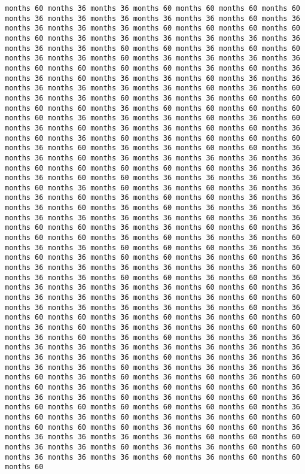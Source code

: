 \documentclass[11pt]{article}
\begin{document}
\begin{Verbatim}[commandchars=\\\{\}, frame=single, framerule=2mm, rulecolor=\color{outerrorbackground}]
months 60 months 36 months 36 months 60 months 60 months 60 months 60 months 36 months 36 months 36 months 36 months 36 months 60 months 36 months 36 months 36 months 36 months 60 months 60 months 60 months 60 months 60 months 36 months 36 months 36 months 36 months 36 months 36 months 36 months 36 months 60 months 60 months 36 months 60 months 60 months 36 months 36 months 60 months 36 months 36 months 36 months 36 months 60 months 60 months 60 months 60 months 36 months 60 months 36 months 36 months 60 months 36 months 36 months 60 months 36 months 36 months 36 months 36 months 36 months 36 months 60 months 36 months 60 months 36 months 36 months 60 months 36 months 36 months 60 months 60 months 60 months 60 months 36 months 60 months 60 months 60 months 60 months 60 months 36 months 36 months 36 months 60 months 36 months 60 months 36 months 60 months 36 months 36 months 60 months 60 months 36 months 60 months 36 months 60 months 36 months 60 months 60 months 60 months 36 months 60 months 36 months 36 months 60 months 60 months 36 months 36 months 60 months 36 months 36 months 36 months 36 months 36 months 60 months 60 months 60 months 60 months 60 months 36 months 36 months 36 months 60 months 60 months 36 months 36 months 36 months 36 months 60 months 36 months 60 months 36 months 60 months 36 months 36 months 36 months 60 months 36 months 60 months 60 months 36 months 36 months 36 months 60 months 36 months 60 months 36 months 36 months 36 months 36 months 36 months 36 months 36 months 60 months 36 months 36 months 60 months 60 months 36 months 36 months 60 months 60 months 36 months 60 months 60 months 36 months 60 months 36 months 36 months 60 months 36 months 36 months 60 months 60 months 60 months 36 months 36 months 60 months 36 months 60 months 60 months 36 months 60 months 36 months 36 months 36 months 36 months 36 months 36 months 36 months 60 months 36 months 36 months 60 months 60 months 36 months 60 months 36 months 36 months 36 months 36 months 36 months 60 months 60 months 36 months 36 months 36 months 36 months 36 months 36 months 60 months 60 months 36 months 36 months 36 months 36 months 36 months 60 months 36 months 60 months 60 months 36 months 60 months 36 months 60 months 60 months 36 months 60 months 36 months 36 months 36 months 60 months 60 months 36 months 60 months 36 months 60 months 36 months 36 months 36 months 36 months 36 months 36 months 36 months 36 months 36 months 36 months 36 months 36 months 36 months 60 months 36 months 36 months 36 months 36 months 36 months 60 months 36 months 36 months 36 months 36 months 60 months 36 months 60 months 36 months 60 months 36 months 60 months 60 months 36 months 36 months 60 months 60 months 60 months 36 months 36 months 36 months 60 months 36 months 60 months 60 months 36 months 60 months 60 months 60 months 60 months 60 months 60 months 36 months 60 months 36 months 60 months 36 months 36 months 60 months 60 months 60 months 60 months 60 months 36 months 60 months 60 months 36 months 36 months 36 months 36 months 36 months 60 months 60 months 60 months 36 months 36 months 60 months 36 months 36 months 60 months 60 months 36 months 36 months 36 months 60 months 36 months 60 months 60 months 60 
\end{Verbatim}
\end{document}
